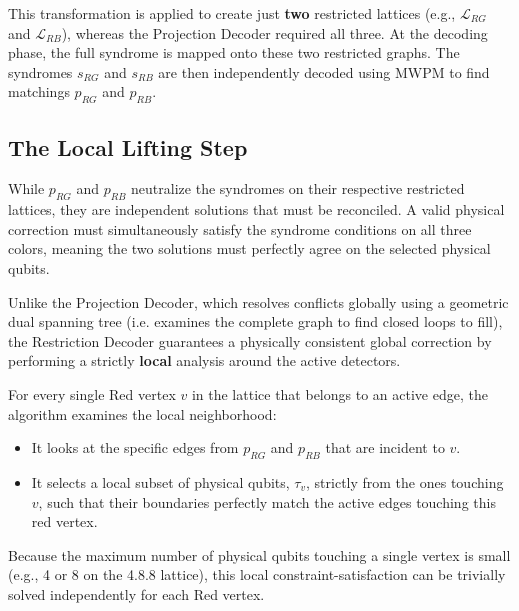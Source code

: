 This transformation is applied to create just \textbf{two} restricted lattices (e.g., $\mathcal{L}_{RG}$ and $\mathcal{L}_{RB}$), whereas the Projection Decoder required all three. At the decoding phase, the full syndrome is mapped onto these two restricted graphs. The syndromes $s_{RG}$ and $s_{RB}$ are then independently decoded using MWPM to find matchings $p_{RG}$ and $p_{RB}$. 

\subsection{The Local Lifting Step}

While $p_{RG}$ and $p_{RB}$ neutralize the syndromes on their respective restricted lattices, they are independent solutions that must be reconciled. A valid physical correction must simultaneously satisfy the syndrome conditions on all three colors, meaning the two solutions must perfectly agree on the selected physical qubits.

Unlike the Projection Decoder, which resolves conflicts globally using a geometric dual spanning tree (i.e. examines the complete graph to find closed loops to fill), the Restriction Decoder guarantees a physically consistent global correction by performing a strictly \textbf{local} analysis around the active detectors. 

 For every single Red vertex $v$ in the lattice that belongs to an active edge, the algorithm examines the local neighborhood:
\begin{itemize}
    \item It looks at the specific edges from $p_{RG}$ and $p_{RB}$ that are incident to $v$.
    \item It selects a local subset of physical qubits, $\tau_v$, strictly from the ones touching $v$, such that their boundaries perfectly match the active edges touching this red vertex.
\end{itemize}
Because the maximum number of physical qubits touching a single vertex is small (e.g., 4 or 8 on the 4.8.8 lattice), this local constraint-satisfaction can be trivially solved independently for each Red vertex.

